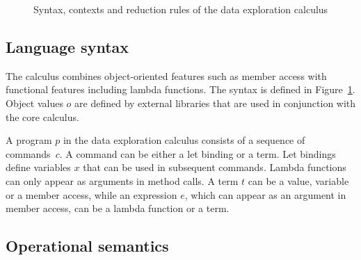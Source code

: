 \documentclass[english,crc]{programming}
\theoremstyle{plain}
\theoremstyle{definition}
\begin{document}
\begin{figure}
\caption{Syntax, contexts and reduction rules of the data exploration calculus}
\label{fig:dec-calculus}
\end{figure}


\subsection{Language syntax}
The calculus combines object-oriented features such as member access with functional features
including lambda functions. The syntax is defined in Figure~\ref{fig:dec-calculus}. Object values
$o$ are defined by external libraries that are used in conjunction with the core calculus.

A program $p$ in the data exploration calculus consists of a sequence of commands~$c$. A command
can be either a let binding or a term. Let bindings define variables $x$ that can be used in
subsequent commands. Lambda functions
can only appear as arguments in method calls. A term $t$ can be a value, variable or a
member access, while an expression $e$, which can appear as an argument in member access,
can be a lambda function or a term.


\subsection{Operational semantics}
\label{sec:calculus-semantics}
\end{document}

